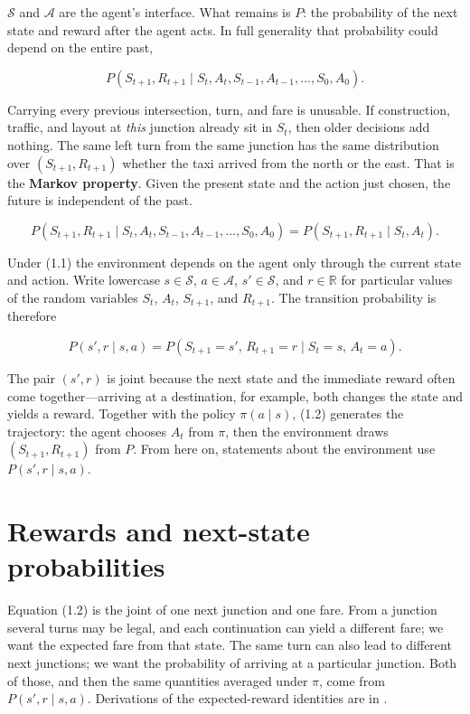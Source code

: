 $\mathcal{S}$ and $\mathcal{A}$ are the agent's interface. What remains is $P$: the probability of the next state and reward after the agent acts. In full generality that probability could depend on the entire past,

\[
P(S_{t+1}, R_{t+1} \mid S_t, A_t, S_{t-1}, A_{t-1}, \dots, S_0, A_0).
\]

Carrying every previous intersection, turn, and fare is unusable. If construction, traffic, and layout at \textit{this} junction already sit in $S_t$, then older decisions add nothing. The same left turn from the same junction has the same distribution over $(S_{t+1}, R_{t+1})$ whether the taxi arrived from the north or the east. That is the \textbf{Markov property}. Given the present state and the action just chosen, the future is independent of the past.

\begin{equation}
P(S_{t+1}, R_{t+1} \mid S_t, A_t, S_{t-1}, A_{t-1}, \dots, S_0, A_0)
=
P(S_{t+1}, R_{t+1} \mid S_t, A_t). \tag{1.1}
\end{equation}

Under (1.1) the environment depends on the agent only through the current state and action. Write lowercase $s \in \mathcal{S}$, $a \in \mathcal{A}$, $s' \in \mathcal{S}$, and $r \in \mathbb{R}$ for particular values of the random variables $S_t$, $A_t$, $S_{t+1}$, and $R_{t+1}$. The transition probability is therefore

\begin{equation}
P(s',r \mid s,a)
=
P\!\left(S_{t+1}=s',\, R_{t+1}=r \mid S_t=s,\, A_t=a\right). \tag{1.2}
\end{equation}

The pair $(s', r)$ is joint because the next state and the immediate reward often come together---arriving at a destination, for example, both changes the state and yields a reward. Together with the policy $\pi(a \mid s)$, (1.2) generates the trajectory: the agent chooses $A_t$ from $\pi$, then the environment draws $(S_{t+1}, R_{t+1})$ from $P$. From here on, statements about the environment use $P(s',r \mid s,a)$.

\section{Rewards and next-state probabilities}

Equation (1.2) is the joint of one next junction and one fare. From a junction several turns may be legal, and each continuation can yield a different fare; we want the expected fare from that state. The same turn can also lead to different next junctions; we want the probability of arriving at a particular junction. Both of those, and then the same quantities averaged under $\pi$, come from $P(s',r\mid s,a)$. Derivations of the expected-reward identities are in .

